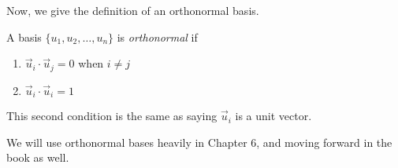 \documentclass{ximera}
\begin{document}
Now, we give the definition of an orthonormal basis.

\begin{definition}
   A basis $\lbrace u_1,u_2,\ldots,u_n\rbrace$ is \emph{orthonormal} if 

   \begin{enumerate}
      \item $\vec{u}_i\cdot\vec{u}_j=0$ when $i\neq j$
      \item $\vec{u}_i\cdot\vec{u}_i=1$
   \end{enumerate}

   This second condition is the same as saying $\vec{u}_i$ is a unit vector.
\end{definition}

We will use orthonormal bases heavily in Chapter 6, and moving forward in the book as well.
\end{document}
